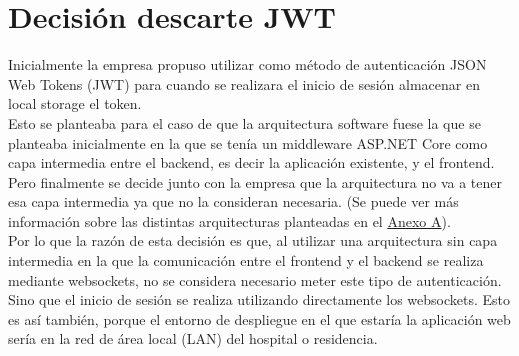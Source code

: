 \chapter{Decisión descarte JWT}
\label{anexo-c}

Inicialmente la empresa propuso utilizar como método de autenticación JSON Web Tokens (JWT) \cite{jwt} para cuando se realizara el inicio de sesión almacenar en local storage el token.\\

Esto se planteaba para el caso de que la arquitectura software fuese la que se planteaba inicialmente en la que se tenía un middleware ASP.NET Core como capa intermedia entre el backend, es decir la aplicación existente, y el frontend. Pero finalmente se decide junto con la empresa que la arquitectura no va a tener esa capa intermedia ya que no la consideran necesaria. (Se puede ver más información sobre las distintas arquitecturas planteadas en el \hyperref[anexo-a]{Anexo A}). \\

Por lo que la razón de esta decisión es que, al utilizar una arquitectura sin capa intermedia en la que la comunicación entre el frontend y el backend se realiza mediante websockets, no se considera necesario meter este tipo de autenticación. Sino que el inicio de sesión se realiza utilizando directamente los websockets. Esto es así también, porque el entorno de despliegue en el que estaría la aplicación web sería en la red de área local (LAN) del hospital o residencia.

